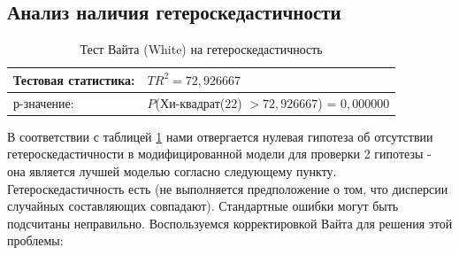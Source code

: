 \documentclass[a4paper,12pt]{article}
\begin{document}
\subsection{Анализ наличия гетероскедастичности}
\begin{table}[H]
	\begin{center}
		\begin{tabular}{ | l | l |}
			\hline
			Тестовая статистика: & $TR^2 = 72,926667$ \\ \hline
			р-значение: & $P$(Хи-квадрат($22$) $> 72,926667$) = $0,000000$ \\ \hline
		\end{tabular}
	\end{center}
	\caption{Тест Вайта (White) на гетероскедастичность}
	\label{tab:white}
\end{table}

В соответствии с таблицей \ref{tab:white} нами отвергается нулевая гипотеза об отсутствии гетероскедастичности в модифицированной модели для проверки 2 гипотезы - она является лучшей моделью согласно следующему пункту. Гетероскедастичность есть (не выполняется предположение о том, что дисперсии случайных составляющих совпадают). Стандартные ошибки могут быть подсчитаны неправильно. Воспользуемся корректировкой Вайта для решения этой проблемы:
\end{document}
